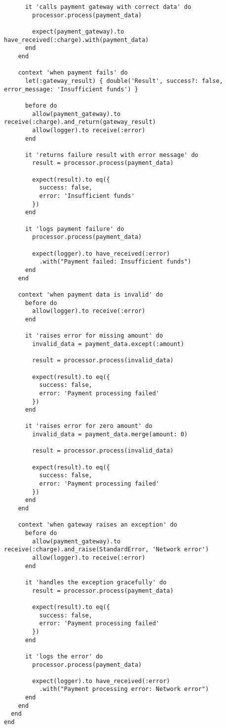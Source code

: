 \documentclass[12pt,a4paper]{article}
\begin{document}
\begin{lstlisting}
      it 'calls payment gateway with correct data' do
        processor.process(payment_data)
        
        expect(payment_gateway).to have_received(:charge).with(payment_data)
      end
    end

    context 'when payment fails' do
      let(:gateway_result) { double('Result', success?: false, error_message: 'Insufficient funds') }

      before do
        allow(payment_gateway).to receive(:charge).and_return(gateway_result)
        allow(logger).to receive(:error)
      end

      it 'returns failure result with error message' do
        result = processor.process(payment_data)
        
        expect(result).to eq({
          success: false,
          error: 'Insufficient funds'
        })
      end

      it 'logs payment failure' do
        processor.process(payment_data)
        
        expect(logger).to have_received(:error)
          .with("Payment failed: Insufficient funds")
      end
    end

    context 'when payment data is invalid' do
      before do
        allow(logger).to receive(:error)
      end

      it 'raises error for missing amount' do
        invalid_data = payment_data.except(:amount)
        
        result = processor.process(invalid_data)
        
        expect(result).to eq({
          success: false,
          error: 'Payment processing failed'
        })
      end

      it 'raises error for zero amount' do
        invalid_data = payment_data.merge(amount: 0)
        
        result = processor.process(invalid_data)
        
        expect(result).to eq({
          success: false,
          error: 'Payment processing failed'
        })
      end
    end

    context 'when gateway raises an exception' do
      before do
        allow(payment_gateway).to receive(:charge).and_raise(StandardError, 'Network error')
        allow(logger).to receive(:error)
      end

      it 'handles the exception gracefully' do
        result = processor.process(payment_data)
        
        expect(result).to eq({
          success: false,
          error: 'Payment processing failed'
        })
      end

      it 'logs the error' do
        processor.process(payment_data)
        
        expect(logger).to have_received(:error)
          .with("Payment processing error: Network error")
      end
    end
  end
end
\end{lstlisting}
\end{document}
